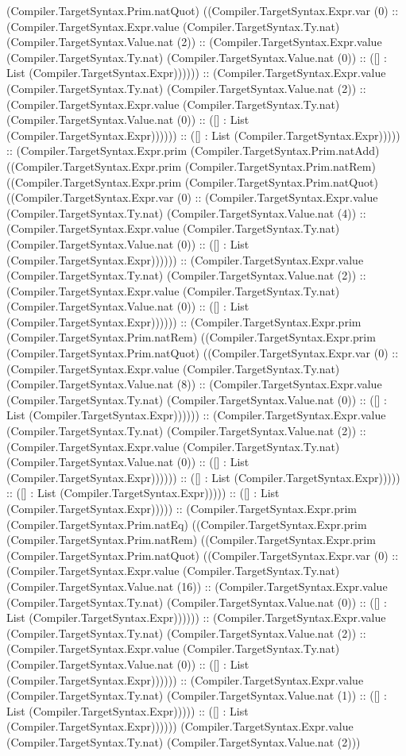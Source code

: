\documentclass[11pt]{article}
\begin{document}
(Compiler.TargetSyntax.Prim.natQuot) ((Compiler.TargetSyntax.Expr.var (0) :: (Compiler.TargetSyntax.Expr.value (Compiler.TargetSyntax.Ty.nat) (Compiler.TargetSyntax.Value.nat (2)) :: (Compiler.TargetSyntax.Expr.value (Compiler.TargetSyntax.Ty.nat) (Compiler.TargetSyntax.Value.nat (0)) :: ([] : List (Compiler.TargetSyntax.Expr)))))) :: (Compiler.TargetSyntax.Expr.value (Compiler.TargetSyntax.Ty.nat) (Compiler.TargetSyntax.Value.nat (2)) :: (Compiler.TargetSyntax.Expr.value (Compiler.TargetSyntax.Ty.nat) (Compiler.TargetSyntax.Value.nat (0)) :: ([] : List (Compiler.TargetSyntax.Expr)))))) :: ([] : List (Compiler.TargetSyntax.Expr))))) :: (Compiler.TargetSyntax.Expr.prim (Compiler.TargetSyntax.Prim.natAdd) ((Compiler.TargetSyntax.Expr.prim (Compiler.TargetSyntax.Prim.natRem) ((Compiler.TargetSyntax.Expr.prim (Compiler.TargetSyntax.Prim.natQuot) ((Compiler.TargetSyntax.Expr.var (0) :: (Compiler.TargetSyntax.Expr.value (Compiler.TargetSyntax.Ty.nat) (Compiler.TargetSyntax.Value.nat (4)) :: (Compiler.TargetSyntax.Expr.value (Compiler.TargetSyntax.Ty.nat) (Compiler.TargetSyntax.Value.nat (0)) :: ([] : List (Compiler.TargetSyntax.Expr)))))) :: (Compiler.TargetSyntax.Expr.value (Compiler.TargetSyntax.Ty.nat) (Compiler.TargetSyntax.Value.nat (2)) :: (Compiler.TargetSyntax.Expr.value (Compiler.TargetSyntax.Ty.nat) (Compiler.TargetSyntax.Value.nat (0)) :: ([] : List (Compiler.TargetSyntax.Expr)))))) :: (Compiler.TargetSyntax.Expr.prim (Compiler.TargetSyntax.Prim.natRem) ((Compiler.TargetSyntax.Expr.prim (Compiler.TargetSyntax.Prim.natQuot) ((Compiler.TargetSyntax.Expr.var (0) :: (Compiler.TargetSyntax.Expr.value (Compiler.TargetSyntax.Ty.nat) (Compiler.TargetSyntax.Value.nat (8)) :: (Compiler.TargetSyntax.Expr.value (Compiler.TargetSyntax.Ty.nat) (Compiler.TargetSyntax.Value.nat (0)) :: ([] : List (Compiler.TargetSyntax.Expr)))))) :: (Compiler.TargetSyntax.Expr.value (Compiler.TargetSyntax.Ty.nat) (Compiler.TargetSyntax.Value.nat (2)) :: (Compiler.TargetSyntax.Expr.value (Compiler.TargetSyntax.Ty.nat) (Compiler.TargetSyntax.Value.nat (0)) :: ([] : List (Compiler.TargetSyntax.Expr)))))) :: ([] : List (Compiler.TargetSyntax.Expr))))) :: ([] : List (Compiler.TargetSyntax.Expr))))) :: ([] : List (Compiler.TargetSyntax.Expr))))) :: (Compiler.TargetSyntax.Expr.prim (Compiler.TargetSyntax.Prim.natEq) ((Compiler.TargetSyntax.Expr.prim (Compiler.TargetSyntax.Prim.natRem) ((Compiler.TargetSyntax.Expr.prim (Compiler.TargetSyntax.Prim.natQuot) ((Compiler.TargetSyntax.Expr.var (0) :: (Compiler.TargetSyntax.Expr.value (Compiler.TargetSyntax.Ty.nat) (Compiler.TargetSyntax.Value.nat (16)) :: (Compiler.TargetSyntax.Expr.value (Compiler.TargetSyntax.Ty.nat) (Compiler.TargetSyntax.Value.nat (0)) :: ([] : List (Compiler.TargetSyntax.Expr)))))) :: (Compiler.TargetSyntax.Expr.value (Compiler.TargetSyntax.Ty.nat) (Compiler.TargetSyntax.Value.nat (2)) :: (Compiler.TargetSyntax.Expr.value (Compiler.TargetSyntax.Ty.nat) (Compiler.TargetSyntax.Value.nat (0)) :: ([] : List (Compiler.TargetSyntax.Expr)))))) :: (Compiler.TargetSyntax.Expr.value (Compiler.TargetSyntax.Ty.nat) (Compiler.TargetSyntax.Value.nat (1)) :: ([] : List (Compiler.TargetSyntax.Expr))))) :: ([] : List (Compiler.TargetSyntax.Expr)))))) (Compiler.TargetSyntax.Expr.value (Compiler.TargetSyntax.Ty.nat) (Compiler.TargetSyntax.Value.nat (2))) 
\end{document}
